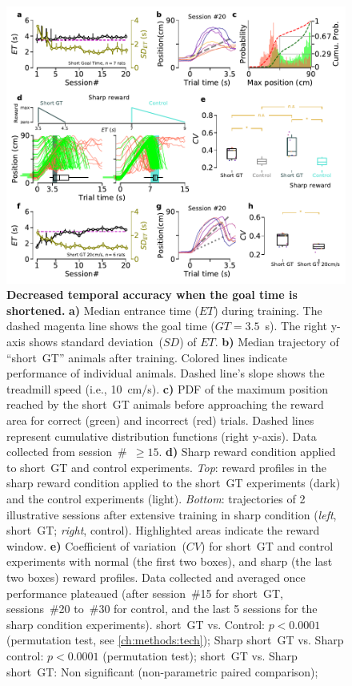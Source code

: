 \begin{figure}[!bt]
  \begin{center}
    \includegraphics[width=.6\linewidth]{ch-time/figures/ShortGT-SharpTrd.pdf}
    \caption[Short~GT \& Sharp Conditions]
    {\textbf{Decreased temporal accuracy when the goal time is shortened.}
    \textbf{a)}
    Median entrance time ($ET$) during training.
    The dashed magenta line shows the goal time ($GT=3.5$~s).
    The right y-axis shows standard deviation~($SD$) of $ET$.
    \textbf{b)}
    Median trajectory of ``short~GT'' animals after training.
    Colored lines indicate performance of individual animals.
    Dashed line's slope shows the treadmill speed (i.e., 10~cm/s).
    \textbf{c)}
    PDF of the maximum position reached by the short~GT animals before approaching the reward area for correct (green) and incorrect (red) trials.
    Dashed lines represent cumulative distribution functions (right y-axis).
    Data collected from session~\#~$\geq15$.
    \textbf{d)} 
    Sharp reward condition applied to short~GT and control experiments.
    \textit{Top}: reward profiles in the sharp reward condition applied to the short~GT experiments (dark) and the control experiments (light).
    \textit{Bottom}: trajectories of 2 illustrative sessions after extensive training in sharp condition (\textit{left}, short~GT; \textit{right}, control).
    Highlighted areas indicate the reward window.
    \textbf{e)}
    Coefficient of variation~($CV$) for short~GT and control experiments with normal (the first two boxes), and sharp (the last two boxes) reward profiles.
    Data collected and averaged once performance plateaued (after session~\#15 for short~GT, sessions~\#20 to~\#30 for control, and the last 5 sessions for the sharp condition experiments).
    short~GT vs. Control: $p<0.0001$ (permutation test, see \autoref{ch:methods:tech});
    Sharp short~GT vs. Sharp control: $p<0.0001$ (permutation test);
    short~GT vs. Sharp short~GT: Non significant (non-parametric paired comparison); 
}
\end{center}
\end{figure}
